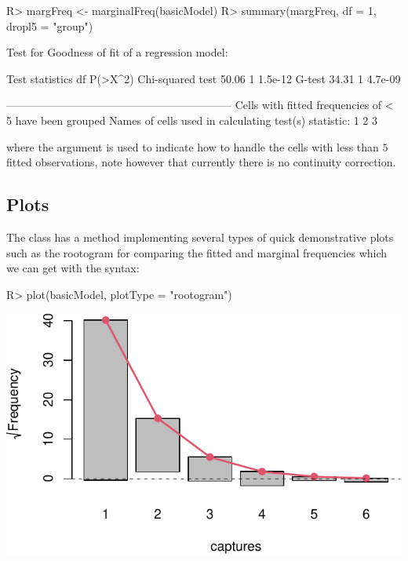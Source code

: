\documentclass[
]{jss}
\newcommand{\1}{\mathcal{I}} \newcommand{\bx}{\boldsymbol{x}}
\begin{document}
\begin{CodeChunk}
\begin{CodeInput}
R> margFreq <- marginalFreq(basicModel)
R> summary(margFreq, df = 1, dropl5 = "group")
\end{CodeInput}
\begin{CodeOutput}
Test for Goodness of fit of a regression model:

                 Test statistics df P(>X^2)
Chi-squared test           50.06  1 1.5e-12
G-test                     34.31  1 4.7e-09

-------------------------------------------------------------- 
Cells with fitted frequencies of < 5 have been grouped 
Names of cells used in calculating test(s) statistic: 1 2 3  
\end{CodeOutput}
\end{CodeChunk}

where the  argument is used to indicate how to handle the
cells with less than \(5\) fitted observations, note however that
currently there is no continuity correction.

\subsection{Plots}\label{plots}

The  class has a  method
implementing several types of quick demonstrative plots such as the
rootogram \cite{rootogram} for comparing the fitted and marginal
frequencies which we can get with the syntax:

\begin{CodeChunk}
\begin{CodeInput}
R> plot(basicModel, plotType = "rootogram")
\end{CodeInput}


\begin{center}\includegraphics{singleRcapture_files/figure-latex/rootogram-1} \end{center}

\end{CodeChunk}
\end{document}
